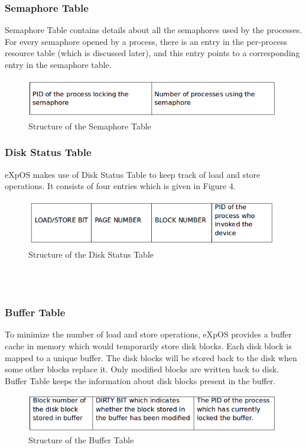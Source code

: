 \documentclass[10pt]{article}
\begin{document}
\subsubsection{Semaphore Table}
Semaphore Table contains details about all the semaphores used by the processes. For every semaphore opened by a process, there is an entry in the per-process resource table (which is discussed later),  and this entry points to a corresponding entry in the semaphore table.
\begin{figure}[ht]
\centering
\includegraphics[scale=0.50]{Semaphore_Table.png}
\caption{\footnotesize Structure of the Semaphore Table}
\label{fig_1}
\end{figure}
\subsubsection{Disk Status Table}
eXpOS makes use of Disk Status Table to keep track of load and store operations. It consists of four entries which is given in Figure 4.
\begin{figure}[ht]
\centering
\includegraphics[scale=0.50]{Disk_Status.png}
\caption{\footnotesize Structure of the Disk Status Table}
\label{fig_1}
\end{figure}
\\ \\
\subsubsection{Buffer Table}
To minimize the number of load and store operations, eXpOS provides a buffer cache in memory which would temporarily store disk blocks. Each disk block is mapped to a unique buffer. The disk blocks will be stored back to the disk when some other blocks replace it. Only modified blocks are written back to disk.
Buffer Table keeps the information about disk blocks present in the buffer.
\begin{figure}[ht]
\centering
\includegraphics[scale=0.50]{Buffer_table.png}
\caption{\footnotesize Structure of the Buffer Table}
\label{fig_1}
\end{figure}
\end{document}
